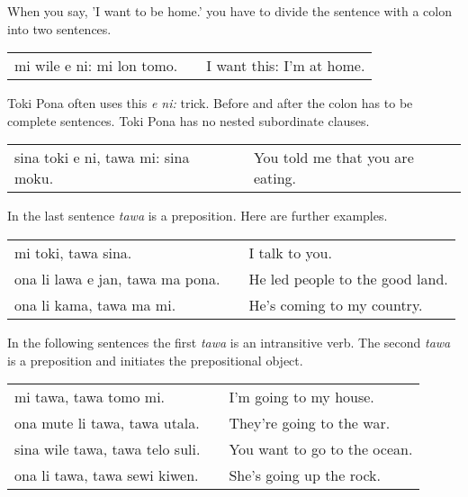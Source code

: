 When you say, 'I want to be home.' you have to divide the sentence with a colon into two sentences.

\begin{supertabular}{p{5,5cm}|ll}
mi wile e ni: mi lon tomo. && I want this: I'm at home. \\
\end{supertabular} 

Toki Pona often uses this \textit{e ni:} trick. 
Before and after the colon has to be complete sentences. 
Toki Pona has no nested subordinate clauses.

\begin{supertabular}{p{5,5cm}|ll}
sina toki e ni, tawa mi: sina moku. && You told me that you are eating. \\
\end{supertabular} 

%
In the last sentence \textit{tawa} is a preposition. 
Here are further examples.

\begin{supertabular}{p{5,5cm}|ll}
mi toki, tawa sina. && I talk to you. \\
ona li lawa e jan, tawa ma pona. && He led people to the good land. \\
ona li kama, tawa ma mi. && He's coming to my country. \\
\end{supertabular} 

In the following sentences the first \textit{tawa} is an intransitive verb.
The second \textit{tawa} is a preposition and initiates the prepositional object. 

\begin{supertabular}{p{5,5cm}|ll}
mi tawa, tawa tomo mi. && I'm going to my house. \\
ona mute li tawa, tawa utala. && They're going to the war. \\
sina wile tawa, tawa telo suli. && You want to go to the ocean. \\
ona li tawa, tawa sewi kiwen. && She's going up the rock. \\
\end{supertabular} 

